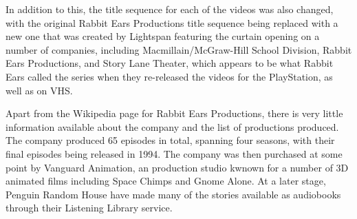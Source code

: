 In addition to this, the title sequence for each of the videos was also changed, with the original Rabbit Ears Productions title sequence being replaced with a new one that was created by Lightspan featuring the curtain opening on a number of companies, including Macmillain/McGraw-Hill School Division, Rabbit Ears Productions, and Story Lane Theater, which appears to be what Rabbit Ears called the series when they re-released the videos for the PlayStation, as well as on VHS.

Apart from the Wikipedia page for Rabbit Ears Productions, there is very little information available about the company and the list of productions produced. The company produced 65 episodes in total, spanning four seasons, with their final episodes being released in 1994. The company was then purchased at some point by Vanguard Animation, an production studio kwnown for a number of 3D animated films including Space Chimps and Gnome Alone. At a later stage, Penguin Random House have made many of the stories available as audiobooks through their Listening Library service.